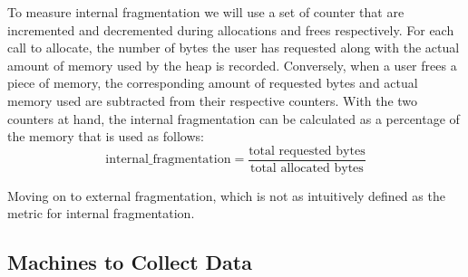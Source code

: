 To measure internal fragmentation we will use a set of counter that are incremented and decremented during allocations and frees respectively. For each call to allocate, the number of bytes the user has requested along with the actual amount of memory used by the heap is recorded. Conversely, when a user frees a piece of memory, the corresponding amount of requested bytes and actual memory used are subtracted from their respective counters. With the two counters at hand, the internal fragmentation can be calculated as a percentage of the memory that is used as follows:
\[
\text{internal\_fragmentation} = \frac{\text{total requested bytes}}{\text{total allocated bytes}}
\]

Moving on to external fragmentation, which is not as intuitively defined as the metric for internal fragmentation.


\subsection{Machines to Collect Data}


